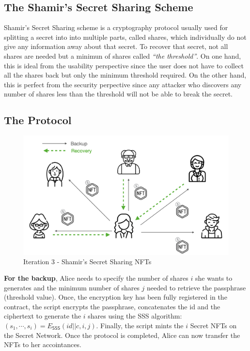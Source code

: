 \documentclass[12pt]{article}
\newcommand{\ms}[1]{\ensuremath{\mathsf{#1}}}
\begin{document}
\subsection{The Shamir's Secret Sharing Scheme}

Shamir's Secret Sharing scheme is a cryptography protocol usually used for splitting a secret into into multiple parts, called shares, which individually do not give any information away about that secret. To recover that secret, not all shares are needed but a minimun of shares called {\em ``the threshold''}. On one hand, this is ideal from the usability perspective since the user does not have to collect all the shares back but only the minimum threshold required. On the other hand, this is perfect from the security perpective since any attacker who discovers any number of shares less than the threshold will not be able to break the secret. \\

\subsection{The Protocol}

\begin{figure}[h!]
  \includegraphics[width=\linewidth]{./media/media-005.png}
  \caption{Iteration 3 - Shamir's Secret Sharing NFTs}
  \label{it3:backup}
\end{figure}

{\bf For the backup}, Alice needs to specify the number of shares $i$ she wants to generates and the minimum number of shares $j$ needed to retrieve the passphrase (threshold value). Once, the encryption key has been fully registered in the contract, the script encrypts the passphrase, concatenates the id and the ciphertext to generate the $i$ shares using the SSS algorithm: $(s_1,\cdots,s_i)=E_{\ms{SSS}}(id||c, i, j)$. Finally, the script mints the $i$ Secret NFTs on the Secret Network. Once the protocol is completed, Alice can now transfer the NFTs to her accointances. \\
\end{document}
